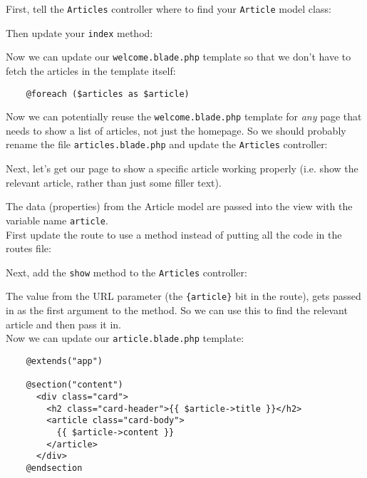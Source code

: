 First, tell the \texttt{Articles} controller where to find your \texttt{Article} model class:


Then update your \texttt{index} method:


Now we can update our \texttt{welcome.blade.php} template so that we don't have to fetch the articles in the template itself:

\begin{verbatim}
    @foreach ($articles as $article)
\end{verbatim}

Now we can potentially reuse the \texttt{welcome.blade.php} template for \textit{any} page that needs to show a list of articles, not just the homepage. So we should probably rename the file \texttt{articles.blade.php} and update the \texttt{Articles} controller:


Next, let's get our page to show a specific article working properly (i.e. show the relevant article, rather than just some filler text).


The data (properties) from the Article model are passed into the view with the variable name \texttt{article}.
\\

First update the route to use a method instead of putting all the code in the routes file:


Next, add the \texttt{show} method to the \texttt{Articles} controller:


The value from the URL parameter (the \texttt{\{article\}} bit in the route), gets passed in as the first argument to the method. So we can use this to find the relevant article and then pass it in.
\\

Now we can update our \texttt{article.blade.php} template:

\begin{verbatim}
    @extends("app")

    @section("content")
      <div class="card">
        <h2 class="card-header">{{ $article->title }}</h2>
        <article class="card-body">
          {{ $article->content }}
        </article>
      </div>
    @endsection
\end{verbatim}

